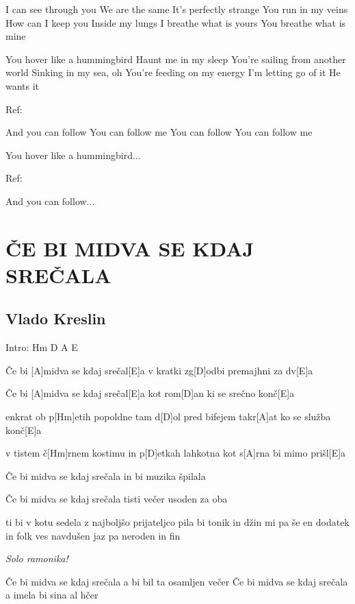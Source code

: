 \documentclass{article}
\begin{document}
\begin{multicols}{2}
\begin{guitar}
    
    
    I can see through you
    We are the same
    It's perfectly strange
    You run in my veins
    How can I keep you
    Inside my lungs
    I breathe what is yours
    You breathe what is mine
    
    You hover like a hummingbird
    Haunt me in my sleep
    You're sailing from another world
    Sinking in my sea, oh
    You're feeding on my energy
    I'm letting go of it
    He wants it
    
	Ref:
    
    And you can follow
    You can follow me
    You can follow
    You can follow me
    
    You hover like a hummingbird...

    Ref:
    
    And you can follow...

 
	
\end{guitar}

\section*{ČE BI MIDVA SE KDAJ SREČALA}
%
\subsection*{Vlado Kreslin}
\begin{guitar}

	Intro: Hm   D    A    E

	Če bi [A]midva  se kdaj srečal[E]a
	v kratki zg[D]odbi premajhni za dv[E]a

	Če bi [A]midva  se kdaj srečal[E]a
	kot rom[D]an ki se srečno konč[E]a

	enkrat ob p[Hm]etih popoldne  tam d[D]ol pred bifejem
	takr[A]at ko se služba konč[E]a

	v tistem č[Hm]rnem  kostimu  in  p[D]etkah
	lahkotna kot s[A]rna   bi  mimo prišl[E]a


	Če bi midva se kdaj srečala
	in bi muzika špilala

	Če bi midva se kdaj srečala
	tisti večer usoden za oba

	ti bi v kotu sedela z najboljšo prijateljco
	pila bi tonik in džin
	mi pa še en dodatek in folk ves navdušen
	jaz pa neroden in fin

	\textit{Solo ramonika!}

	Če bi midva se kdaj srečala
	a bi bil ta osamljen večer
	Če bi midva se kdaj srečala
	a imela bi sina al hčer


\end{guitar}
\end{multicols}
\end{document}
